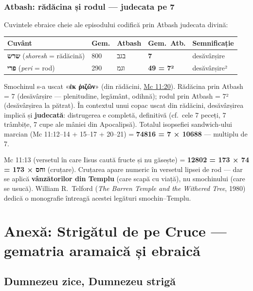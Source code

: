\documentclass[12pt,a4paper,twoside,openany]{book}
\begin{document}
\subsection{Atbash: rădăcina și rodul — judecata pe 7}

Cuvintele ebraice cheie ale episodului codifică prin Atbash judecata divină:

\begin{center}
\small
\begin{tabularx}{\textwidth}{L{3.5cm}C{1.5cm}L{2cm}C{1.5cm}X}
\toprule
{}
\textbf{Cuvânt} & \textbf{Gem.} & \textbf{Atbash} & \textbf{Gem.\ Atb.} & \textbf{Semnificație} \\
\midrule
\textbf{שרש} (\textit{shoresh} = rădăcină) & 800 & בגב & \textbf{7} & desăvârșire \\
\textbf{פרי} (\textit{peri} = rod) & 290 & וגמ & \textbf{49 = 7²} & desăvârșire² \\
\bottomrule
\end{tabularx}
\end{center}

Smochinul s-a uscat «\textbf{ἐκ ῥιζῶν}» (din rădăcini, \href{https://bibliaortodoxa.ro/carte.php?id=53\&cap=11\#20}{Mc 11:20}). Rădăcina prin Atbash = 7 (desăvârșire — plenitudine, legământ, odihnă); rodul prin Atbash = 7² (desăvârșirea la pătrat). În contextul unui copac uscat din rădăcini, desăvârșirea implică și \textbf{judecată}: distrugerea e completă, definitivă (cf.\ cele 7 peceți, 7 trâmbițe, 7 cupe ale mâniei din Apocalipsă). Totalul isopsefiei sandwich-ului marcian (Mc 11:12--14 + 15--17 + 20--21) = \textbf{74816 = 7 × 10688} — multiplu de 7.

Mc 11:13 (versetul în care Iisus caută fructe și nu găsește) = \textbf{12802 = 173 × 74 = 173 × וחס} (cruțare). Cruțarea apare numeric în versetul lipsei de rod — dar se aplică \textbf{vânzătorilor din Templu} (care scapă cu viață), nu smochinului (care se usucă). William R.~Telford (\textit{The Barren Temple and the Withered Tree}, 1980) dedică o monografie întreagă acestei legături smochin--Templu.

\chapter{Anexă: Strigătul de pe Cruce — gematria aramaică și ebraică}\label{strigat}

\section{Dumnezeu zice, Dumnezeu strigă}
\end{document}
